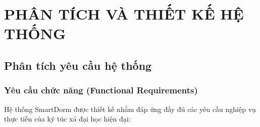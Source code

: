 \chapter{PHÂN TÍCH VÀ THIẾT KẾ HỆ THỐNG}
\label{ch:chuong3}

\section{Phân tích yêu cầu hệ thống}
\label{sec:phan_tich_yeu_cau}

\subsection{Yêu cầu chức năng (Functional Requirements)}
Hệ thống SmartDorm được thiết kế nhằm đáp ứng đầy đủ các yêu cầu nghiệp vụ thực tiễn của ký túc xá đại học hiện đại:

